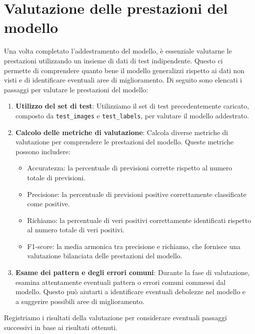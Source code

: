 \documentclass{article}
\begin{document}
\section{Valutazione delle prestazioni del modello}

Una volta completato l'addestramento del modello, è essenziale valutarne le prestazioni utilizzando un insieme di dati di test indipendente. Questo ci permette di comprendere quanto bene il modello generalizzi rispetto ai dati non visti e di identificare eventuali aree di miglioramento. Di seguito sono elencati i passaggi per valutare le prestazioni del modello:

\begin{enumerate}
    \item \textbf{Utilizzo del set di test}: Utilizziamo il set di test precedentemente caricato, composto da \texttt{test\_images} e \texttt{test\_labels}, per valutare il modello addestrato.
    
    \item \textbf{Calcolo delle metriche di valutazione}: Calcola diverse metriche di valutazione per comprendere le prestazioni del modello. Queste metriche possono includere:
        \begin{itemize}
            \item Accuratezza: la percentuale di previsioni corrette rispetto al numero totale di previsioni.
            \item Precisione: la percentuale di previsioni positive correttamente classificate come positive.
            \item Richiamo: la percentuale di veri positivi correttamente identificati rispetto al numero totale di veri positivi.
            \item F1-score: la media armonica tra precisione e richiamo, che fornisce una valutazione bilanciata delle prestazioni del modello.
        \end{itemize}
    
    \item \textbf{Esame dei pattern e degli errori comuni}: Durante la fase di valutazione, esamina attentamente eventuali pattern o errori comuni commessi dal modello. Questo può aiutarti a identificare eventuali debolezze nel modello e a suggerire possibili aree di miglioramento.
\end{enumerate}

Registriamo i risultati della valutazione per considerare eventuali passaggi successivi in base ai risultati ottenuti.
\end{document}
